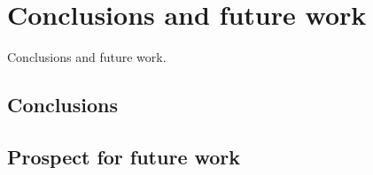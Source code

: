 \chapter{Conclusions and future work}\label{ch:future_work}
Conclusions and future work.

\section{Conclusions}

\section{Prospect for future work}
		